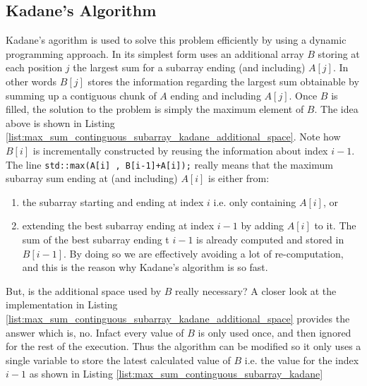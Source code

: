\subsection{Kadane's Algorithm}
\label{sec:kadane_algorithm}
Kadane's agorithm is used to solve this problem efficiently by using a dynamic programming approach. 
In its simplest form uses an additional array $B$ storing at each position $j$ the largest sum for a subarray ending (and including) $A[j]$. In other words $B[j]$ stores the information regarding the largest sum obtainable by summing up a contiguous chunk of $A$ ending and including $A[j]$. Once $B$ is filled, the solution to the problem is simply the maximum element of $B$. The idea above is shown in Listing \ref{list:max_sum_continguous_subarray_kadane_additional_space}.
Note how $B[i]$ is incrementally constructed by reusing the information about index $i-1$. The line \lstinline[columns=fixed]{std::max(A[i] , B[i-1]+A[i]);} really means that the maximum subarray sum ending at (and including) $A[i]$ is either from:
\begin{enumerate}
	\item the subarray starting and ending at index $i$ i.e. only containing $A[i]$, or
	\item extending the best subarray ending at index $i-1$ by adding $A[i]$ to it. The sum of the best subarray ending t $i-1$ is already computed and stored in $B[i-1]$. By doing so we are effectively avoiding a lot of re-computation, and this is the reason why Kadane's algorithm is so fast.
\end{enumerate}



But, is the additional space used by $B$ really necessary? A closer look at the implementation in Listing \ref{list:max_sum_continguous_subarray_kadane_additional_space} provides the answer which is, no. Infact every value of $B$ is only used once, and then ignored for the rest of the execution. Thus the algorithm can be modified so it only uses a single variable to store the latest calculated value of $B$ i.e. the value for the index $i-1$ as shown in Listing \ref{list:max_sum_continguous_subarray_kadane}



